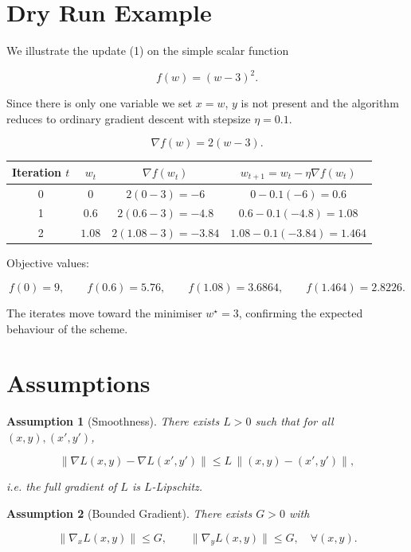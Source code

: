 \documentclass{article}
\newtheorem{assumption}{Assumption}
\begin{document}
\section*{Dry Run Example}
We illustrate the update (1) on the simple scalar function  

\[
f(w)=(w-3)^2 .
\]

Since there is only one variable we set \(x=w\), \(y\) is not present and the algorithm reduces to ordinary gradient descent with stepsize \(\eta=0.1\).  

\[
\nabla f(w)=2(w-3).
\]

\begin{center}
\begin{tabular}{c|c|c|c}
Iteration $t$ & $w_t$ & $\nabla f(w_t)$ & $w_{t+1}=w_t-\eta\nabla f(w_t)$ \\ \hline
0 & $0$ & $2(0-3)=-6$ & $0-0.1(-6)=0.6$ \\
1 & $0.6$ & $2(0.6-3)=-4.8$ & $0.6-0.1(-4.8)=1.08$ \\
2 & $1.08$ & $2(1.08-3)=-3.84$ & $1.08-0.1(-3.84)=1.464$ \\
\end{tabular}
\end{center}

Objective values:

\[
f(0)=9,\qquad f(0.6)=5.76,\qquad f(1.08)=3.6864,\qquad f(1.464)=2.8226.
\]

The iterates move toward the minimiser \(w^\star=3\), confirming the expected behaviour of the scheme.

\newpage
\section*{Assumptions}
\begin{assumption}[Smoothness]\label{as:smooth}
There exists \(L>0\) such that for all \((x,y),(x',y')\),

\[
\big\|\nabla L(x,y)-\nabla L(x',y')\big\|\le L\,
\big\|(x,y)-(x',y')\big\|,
\]

i.e. the full gradient of \(L\) is \(L\)-Lipschitz.
\end{assumption}

\begin{assumption}[Bounded Gradient]\label{as:bound}
There exists \(G>0\) with  

\[
\|\nabla_x L(x,y)\|\le G,\qquad \|\nabla_y L(x,y)\|\le G,\quad\forall (x,y).
\]
\end{assumption}
\end{document}
